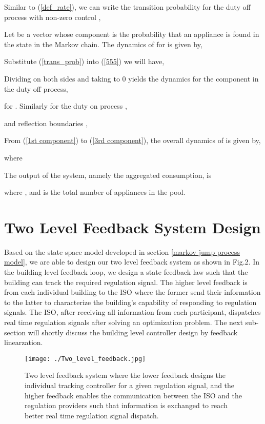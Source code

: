 \documentclass[journal]{IEEEtran}
\begin{document}
Similar to (\ref{def_rate}), we can write the transition probability for the duty off process with non-zero control ,

Let  be a vector whose  component is the probability that an appliance is found in the  state in the Markov chain. The dynamics of  for  is given by,

Substitute (\ref{trans_prob}) into (\ref{555}) we will have,

Dividing  on both sides and taking  to 0 yields the dynamics for the  component in the duty off process,

for . Similarly for the duty on process ,

and reflection boundaries ,

From (\ref{1st component}) to (\ref{3rd component}), the overall dynamics of  is given by,

where
{\footnotesize


}
The output of the system, namely the aggregated consumption, is

where , and  is the total number of appliances in the pool.

\section{Two Level Feedback System Design}
\label{two level feedback system design}
Based on the state space model developed in section \ref{markov jump process model}, we are able to design our two level feedback system as shown in Fig.2. In the building level feedback loop, we design a state feedback law such that the building can track the required regulation signal. The higher level feedback is from each individual building to the ISO where the former send their information to the latter to characterize the building's capability of responding to regulation signals. The ISO, after receiving all information from each participant, dispatches real time regulation signals after solving an optimization problem. The next sub-section will shortly discuss the building level controller design by feedback linearzation.
\begin{figure}[htb]
\centering
\label{Two_level_feedback}
\texttt{[image: ./Two\_level\_feedback.jpg]}
\caption{Two level feedback system where the lower feedback designs the individual tracking controller for a given regulation signal, and the higher feedback enables the communication between the ISO and the regulation providers such that information is exchanged to reach better real time regulation signal dispatch.}
\end{figure}
\end{document}
